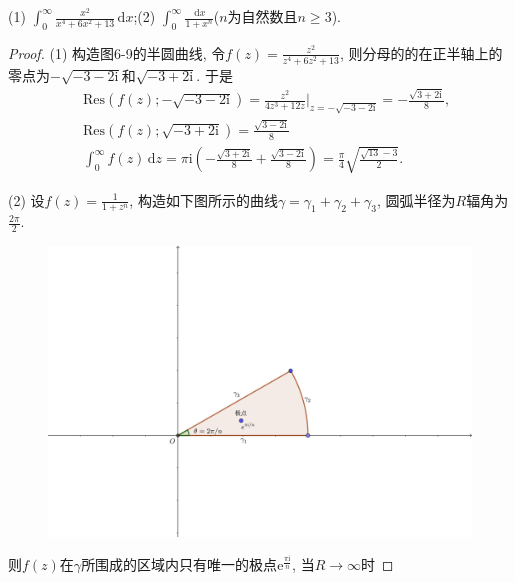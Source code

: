 \documentclass[12pt, a4paper, oneside]{ctexart}
\let\geq=\geqslant %
\def\res{\text{Res}}
\def\d{\mathrm{d}}      %
\def\e{\mathrm{e}}      %
\def\i{\mathrm{i}}      %
\begin{document}
(1) $\int_0^{\infty}\frac{x^2}{x^4+6x^2+13}\,\d x$;\qquad (2) $\int_0^{\infty}\frac{\,\d x}{1+x^n}$($n$为自然数且$n\geq 3$).
\begin{proof}
    (1) 构造图6-9的半圆曲线, 令$f(z) = \frac{z^2}{z^4+6z^2+13}$, 则分母的的在正半轴上的零点为$-\sqrt{-3-2\i}$和$\sqrt{-3+2\i}$. 于是
    \begin{align*}
        &\ \res(f(z);-\sqrt{-3-2\i}) = \frac{z^2}{4z^3+12z}\biggl|_{z=-\sqrt{-3-2\i}} = -\frac{\sqrt{3+2\i}}{8},\\
        &\ \res(f(z);\sqrt{-3+2\i}) = \frac{\sqrt{3-2\i}}{8}\\
        &\ \int_{0}^\infty f(z)\,\d z = \pi \i\left(-\frac{\sqrt{3+2\i}}{8}+\frac{\sqrt{3-2\i}}{8}\right) = \frac{\pi}{4}\sqrt{\frac{\sqrt{13}-3}{2}}.
    \end{align*}

    (2) 设$f(z) = \frac{1}{1+z^n}$, 构造如下图所示的曲线$\gamma = \gamma_1+\gamma_2+\gamma_3$, 圆弧半径为$R$辐角为$\frac{2\pi}{2}$.
    \begin{figure}[htbp]
        \centering
        \includegraphics[scale=0.5]{用留数计算1_(1+x^n)在0到正无穷积分.pdf}
    \end{figure}
    
    则$f(z)$在$\gamma$所围成的区域内只有唯一的极点$\e^{\frac{\pi\i}{n}}$, 当$R\to\infty$时


\end{proof}
\end{document}
